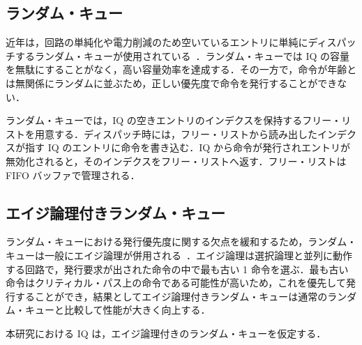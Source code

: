 \subsection{ランダム・キュー}
近年は，回路の単純化や電力削減のため空いているエントリに単純にディスパッチするランダム・キューが使用されている~\cite{Alpha21464, AMD-Bulldozer, IBM-Power8}．ランダム・キューでは IQ の容量を無駄にすることがなく，高い容量効率を達成する．その一方で，命令が年齢とは無関係にランダムに並ぶため，正しい優先度で命令を発行することができない．

ランダム・キューでは，IQ の空きエントリのインデクスを保持するフリー・リストを用意する．ディスパッチ時には，フリー・リストから読み出したインデクスが指す IQ のエントリに命令を書き込む．IQ から命令が発行されエントリが無効化されると，そのインデクスをフリー・リストへ返す．フリー・リストは FIFO バッファで管理される．

\subsection{エイジ論理付きランダム・キュー}
ランダム・キューにおける発行優先度に関する欠点を緩和するため，ランダム・キューは一般にエイジ論理が併用される~\cite{Alpha21464}．エイジ論理は選択論理と並列に動作する回路で，発行要求が出された命令の中で最も古い 1 命令を選ぶ．最も古い命令はクリティカル・パス上の命令である可能性が高いため，これを優先して発行することができ，結果としてエイジ論理付きランダム・キューは通常のランダム・キューと比較して性能が大きく向上する．

本研究における IQ は，エイジ論理付きのランダム・キューを仮定する．

